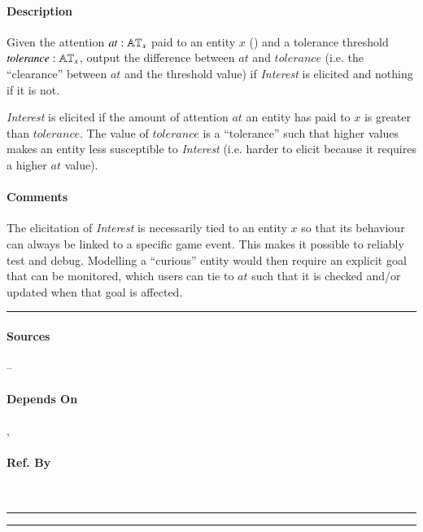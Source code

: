 \paragraph{Description} Given the attention $at : \mathbb{AT}_x$ paid to an
entity $x$ () and a tolerance threshold $\mathit{tolerance}
: \mathbb{AT}_x $, output the difference between $at$ and $\mathit{tolerance}$
(i.e. the ``clearance'' between $at$ and the threshold value) if
\textit{Interest} is elicited and nothing if it is not.

\textit{Interest} is elicited if the amount of attention $at$ an entity has
paid to $x$ is greater than $\mathit{tolerance}$. The value of
$\mathit{tolerance}$ is a ``tolerance'' such that higher values makes an entity
less susceptible to \textit{Interest} (i.e. harder to elicit because it
requires a higher $at$ value).

\paragraph{Comments} The elicitation of \textit{Interest} is necessarily tied
to an entity $x$ so that its behaviour can always be linked to a specific game
event. This makes it possible to reliably test and debug. Modelling a
``curious'' entity would then require an explicit goal that can be monitored,
which users can tie to $at$ such that it is checked and/or updated when that
goal is affected. \\\hrule

\paragraph{Sources} --

\paragraph{Depends On} , 

\paragraph{Ref. By}  \\\hrule\vspace{0.5mm}\hrule

~\newline

